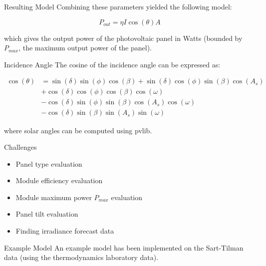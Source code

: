 \documentclass[12pt]{beamer}
\begin{document}
\begin{frame}{Resulting Model}
    Combining these parameters yielded the following model:
    
    \begin{equation*}
        P_{out} = \eta I \cos(\theta) A
    \end{equation*}
    
    which gives the output power of the photovoltaic panel in Watts (bounded by $P_{max}$, the maximum output power of the panel).
\end{frame}

\begin{frame}{Incidence Angle}
    The cosine of the incidence angle can be expressed as\cite{itaca}:
    
    $$
    \begin{aligned}
        \cos(\theta) & = \sin(\delta)\sin(\phi)\cos(\beta) + \sin(\delta)\cos(\phi)\sin(\beta)\cos(A_s) \\
        & + \cos(\delta)\cos(\phi)\cos(\beta)\cos(\omega) \\
        &- \cos(\delta)\sin(\phi)\sin(\beta)\cos(A_s)\cos(\omega) \\
        &-  \cos(\delta)\sin(\beta)\sin(A_s)\sin(\omega)
    \end{aligned}
    $$
    
    where solar angles can be computed using \alert{pvlib}.
\end{frame}

\begin{frame}{Challenges}
    \begin{itemize}
        \item Panel \alert{type} evaluation
        \item Module \alert{efficiency} evaluation
        \item Module maximum power \alert{$P_{max}$} evaluation
        \item Panel \alert{tilt} evaluation
        \item Finding irradiance \alert{forecast} data
    \end{itemize}
\end{frame}

\begin{frame}{Example Model}
    An example model has been implemented on the Sart-Tilman data (using the thermodynamics laboratory data).
\end{frame}
\end{document}

